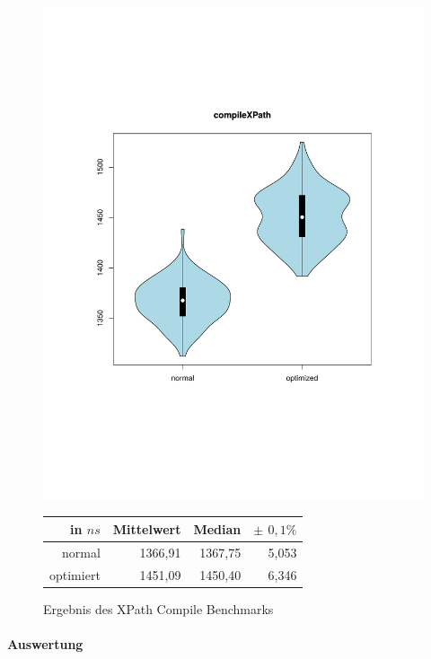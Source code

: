 \begin{figure}[H]
{		\includegraphics[trim=20mm 60mm 0mm 50mm,scale=0.50]{pictures/vioplot_compileXPath.pdf}
	}

	\begin{table}[H]
	\centering
		\begin{tabular}{|r|r|r|r|}
			\hline
		   	in $ns$ 	  & Mittelwert & Median & \bf{$\pm$ $0,1\%$} \\
		 	\hline
		 	\hline
		  	normal 	  & 1366,91 & 1367,75 & 5,053 \\
		 	optimiert & 1451,09 & 1450,40 & 6,346 \\ 
		  	\hline
		  	
		\end{tabular}
	\end{table}

	\caption{Ergebnis des XPath Compile Benchmarks}\label{bp:compile}
\end{figure}

\paragraph{Auswertung}

